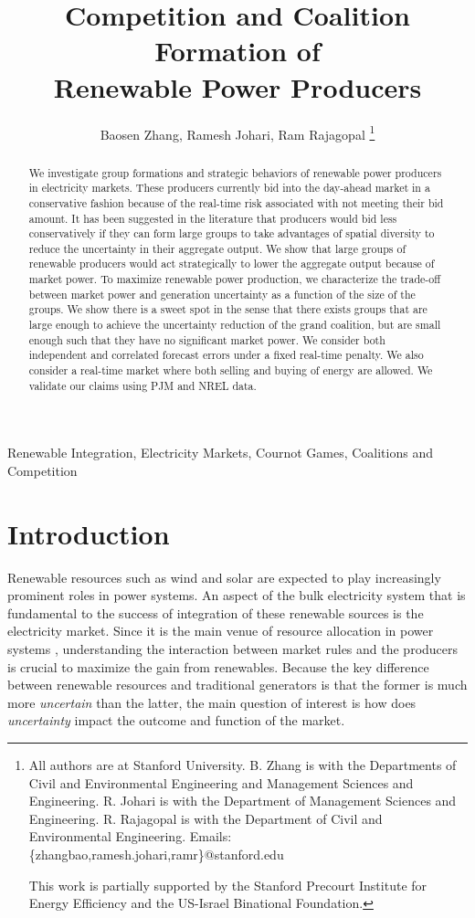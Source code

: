 \documentclass[journal]{IEEEtran}
\title{Competition and Coalition Formation of \\Renewable Power Producers}
\author{Baosen Zhang, Ramesh Johari, Ram Rajagopal
\thanks{All authors are at Stanford University. B. Zhang is with the Departments of Civil and Environmental Engineering and Management Sciences and Engineering. R. Johari is with the Department of Management Sciences and Engineering. R. Rajagopal is with the Department of Civil and Environmental Engineering.  Emails: \{zhangbao,ramesh.johari,ramr\}@stanford.edu 

 This work is partially supported by the Stanford Precourt Institute for Energy Efficiency and the US-Israel Binational Foundation.}}
\begin{document}
\maketitle

\begin{abstract}
We investigate group formations and strategic behaviors of renewable power producers in electricity markets. These producers currently bid into the day-ahead market in a conservative fashion because of the real-time risk associated with not meeting their bid amount. It has been suggested in the literature that producers would bid less conservatively if they can form large groups to take advantages of spatial diversity to reduce the uncertainty in their aggregate output. We show that large groups of renewable producers would act strategically to lower the aggregate output because of market power. To maximize renewable power production, we characterize the trade-off between market power and generation uncertainty as a function of the size of the groups. We show there is a sweet spot in the sense that there exists groups that are large enough to achieve the uncertainty reduction of the grand coalition, but are small enough such that they have no significant market power. We consider both independent and correlated forecast errors under a fixed real-time penalty. We also consider a real-time market where both selling and buying of energy are allowed.  We validate our claims using PJM and NREL data.
\end{abstract}
\begin{IEEEkeywords}
Renewable Integration, Electricity Markets, Cournot Games, Coalitions and Competition
\end{IEEEkeywords}
\section{Introduction}
Renewable resources such as wind and solar are expected to play increasingly prominent roles in power systems. An aspect of the bulk electricity system that is fundamental to the success of integration of these renewable sources is the electricity market. Since it is the main venue of resource allocation in power systems \cite{Kirschen04}, understanding the interaction between market rules and the producers is crucial to maximize the gain from renewables. Because the key difference between renewable resources and traditional generators is that the former is much more \emph{uncertain} than the latter,  the main question of interest is how does \emph{uncertainty} impact the outcome and function of the market. 
\end{document}

